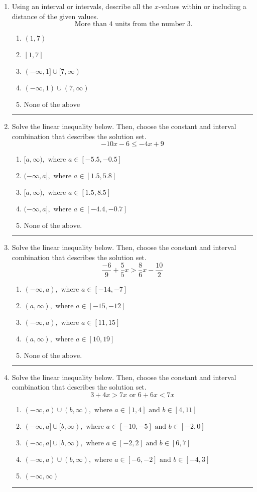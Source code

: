 \documentclass[14pt]{extbook}
\newcommand{\litem}[1]{\item#1\hspace*{-1cm}\rule{\textwidth}{0.4pt}}
\begin{document}
\begin{enumerate}
\litem{
Using an interval or intervals, describe all the $x$-values within or including a distance of the given values.\[ \text{ More than } 4 \text{ units from the number } 3. \]\begin{enumerate}[label=\Alph*.]
\item \( (1, 7) \)
\item \( [1, 7] \)
\item \( (-\infty, 1] \cup [7, \infty) \)
\item \( (-\infty, 1) \cup (7, \infty) \)
\item \( \text{None of the above} \)

\end{enumerate} }
\litem{
Solve the linear inequality below. Then, choose the constant and interval combination that describes the solution set.\[ -10x -6 \leq -4x + 9 \]\begin{enumerate}[label=\Alph*.]
\item \( [a, \infty), \text{ where } a \in [-5.5, -0.5] \)
\item \( (-\infty, a], \text{ where } a \in [1.5, 5.8] \)
\item \( [a, \infty), \text{ where } a \in [1.5, 8.5] \)
\item \( (-\infty, a], \text{ where } a \in [-4.4, -0.7] \)
\item \( \text{None of the above}. \)

\end{enumerate} }
\litem{
Solve the linear inequality below. Then, choose the constant and interval combination that describes the solution set.\[ \frac{-6}{9} + \frac{5}{5} x > \frac{8}{6} x - \frac{10}{2} \]\begin{enumerate}[label=\Alph*.]
\item \( (-\infty, a), \text{ where } a \in [-14, -7] \)
\item \( (a, \infty), \text{ where } a \in [-15, -12] \)
\item \( (-\infty, a), \text{ where } a \in [11, 15] \)
\item \( (a, \infty), \text{ where } a \in [10, 19] \)
\item \( \text{None of the above}. \)

\end{enumerate} }
\litem{
Solve the linear inequality below. Then, choose the constant and interval combination that describes the solution set.\[ 3 + 4 x > 7 x \text{ or } 6 + 6 x < 7 x \]\begin{enumerate}[label=\Alph*.]
\item \( (-\infty, a) \cup (b, \infty), \text{ where } a \in [1, 4] \text{ and } b \in [4, 11] \)
\item \( (-\infty, a] \cup [b, \infty), \text{ where } a \in [-10, -5] \text{ and } b \in [-2, 0] \)
\item \( (-\infty, a] \cup [b, \infty), \text{ where } a \in [-2, 2] \text{ and } b \in [6, 7] \)
\item \( (-\infty, a) \cup (b, \infty), \text{ where } a \in [-6, -2] \text{ and } b \in [-4, 3] \)
\item \( (-\infty, \infty) \)


\end{enumerate}}
\end{enumerate}
\end{document}
